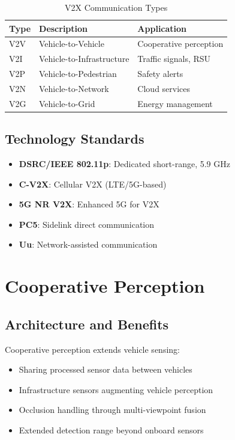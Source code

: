 \documentclass[12pt,a4paper]{article}
\begin{document}
\begin{table}[H]
\centering
\caption{V2X Communication Types}
\begin{tabular}{lll}
\toprule
\textbf{Type} & \textbf{Description} & \textbf{Application} \\
\midrule
V2V & Vehicle-to-Vehicle & Cooperative perception \\
V2I & Vehicle-to-Infrastructure & Traffic signals, RSU \\
V2P & Vehicle-to-Pedestrian & Safety alerts \\
V2N & Vehicle-to-Network & Cloud services \\
V2G & Vehicle-to-Grid & Energy management \\
\bottomrule
\end{tabular}
\end{table}

\subsection{Technology Standards}

\begin{tcolorbox}[colback=v2xblue!10, colframe=v2xblue, title=V2X Technology Standards]
\begin{itemize}
    \item \textbf{DSRC/IEEE 802.11p}: Dedicated short-range, 5.9 GHz
    \item \textbf{C-V2X}: Cellular V2X (LTE/5G-based)
    \item \textbf{5G NR V2X}: Enhanced 5G for V2X
    \item \textbf{PC5}: Sidelink direct communication
    \item \textbf{Uu}: Network-assisted communication
\end{itemize}
\end{tcolorbox}

\section{Cooperative Perception}

\subsection{Architecture and Benefits}

Cooperative perception extends vehicle sensing:
\begin{itemize}
    \item Sharing processed sensor data between vehicles
    \item Infrastructure sensors augmenting vehicle perception
    \item Occlusion handling through multi-viewpoint fusion
    \item Extended detection range beyond onboard sensors
\end{itemize}
\end{document}
